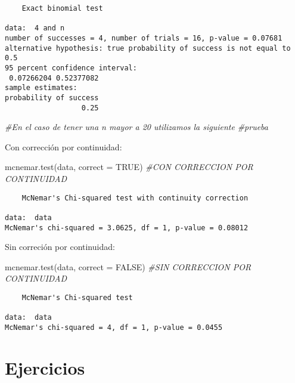 \documentclass[
  a4paper,
  oneside,
  openany]{book}
\newenvironment{Shaded}{\begin{snugshade}}{\end{snugshade}}
\newcommand{\AttributeTok}[1]{\textcolor[rgb]{0.77,0.63,0.00}{#1}}
\newcommand{\CommentTok}[1]{\textcolor[rgb]{0.56,0.35,0.01}{\textit{#1}}}
\newcommand{\ConstantTok}[1]{\textcolor[rgb]{0.00,0.00,0.00}{#1}}
\newcommand{\FunctionTok}[1]{\textcolor[rgb]{0.00,0.00,0.00}{#1}}
\newcommand{\NormalTok}[1]{#1}
\begin{document}
\begin{verbatim}
    Exact binomial test

data:  4 and n
number of successes = 4, number of trials = 16, p-value = 0.07681
alternative hypothesis: true probability of success is not equal to 0.5
95 percent confidence interval:
 0.07266204 0.52377082
sample estimates:
probability of success 
                  0.25 
\end{verbatim}

\begin{Shaded}
\begin{Highlighting}[]
\CommentTok{\#En el caso de tener una n mayor a 20 utilizamos la siguiente}
\CommentTok{\#prueba}
\end{Highlighting}
\end{Shaded}

Con corrección por continuidad:

\begin{Shaded}
\begin{Highlighting}[]
\FunctionTok{mcnemar.test}\NormalTok{(data, }\AttributeTok{correct =} \ConstantTok{TRUE}\NormalTok{) }\CommentTok{\#CON CORRECCION POR CONTINUIDAD}
\end{Highlighting}
\end{Shaded}

\begin{verbatim}
    McNemar's Chi-squared test with continuity correction

data:  data
McNemar's chi-squared = 3.0625, df = 1, p-value = 0.08012
\end{verbatim}

Sin correción por continuidad:

\begin{Shaded}
\begin{Highlighting}[]
\FunctionTok{mcnemar.test}\NormalTok{(data, }\AttributeTok{correct =} \ConstantTok{FALSE}\NormalTok{) }\CommentTok{\#SIN CORRECCION POR CONTINUIDAD}
\end{Highlighting}
\end{Shaded}

\begin{verbatim}
    McNemar's Chi-squared test

data:  data
McNemar's chi-squared = 4, df = 1, p-value = 0.0455
\end{verbatim}

\hypertarget{ejercicios-3}{%
\section{Ejercicios}\label{ejercicios-3}}
\end{document}
